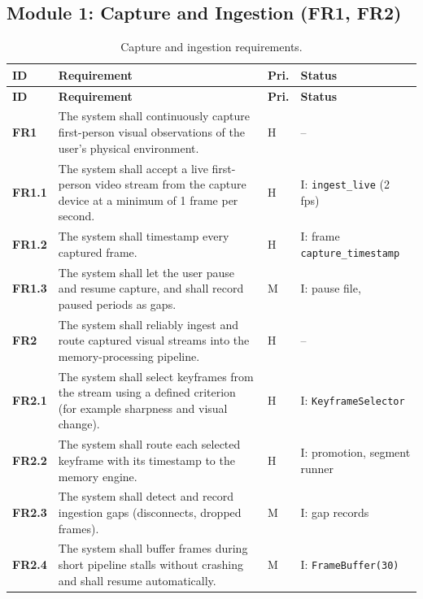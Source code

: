 \subsection{Module 1: Capture and Ingestion (FR1, FR2)}
\begin{ltab}
\begin{longtable}{@{}>{\bfseries}L{1.2cm}L{9.6cm}L{0.8cm}L{3.0cm}@{}}
\caption{Capture and ingestion requirements.}\\
\toprule
{}\textbf{ID} & \textbf{Requirement} & \textbf{Pri.} & \textbf{Status}\\
\midrule
\endfirsthead
\toprule
{}\textbf{ID} & \textbf{Requirement} & \textbf{Pri.} & \textbf{Status}\\
\midrule
\endhead
\bottomrule
\endfoot
{}FR1 & The system shall continuously capture first-person visual
observations of the user's physical environment. & H & --\\
FR1.1 & The system shall accept a live first-person video stream from the capture
device at a minimum of 1 frame per second. & H & I: \texttt{ingest\_live} (2 fps)\\
FR1.2 & The system shall timestamp every captured frame. & H & I: frame \texttt{capture\_timestamp}\\
FR1.3 & The system shall let the user pause and resume capture, and shall record
paused periods as gaps. & M & I: pause file, \\
FR2 & The system shall reliably ingest and route captured
visual streams into the memory-processing pipeline. & H & --\\
FR2.1 & The system shall select keyframes from the stream using a defined
criterion (for example sharpness and visual change). & H & I: \texttt{KeyframeSelector}\\
FR2.2 & The system shall route each selected keyframe with its timestamp to the
memory engine. & H & I: promotion, segment runner\\
FR2.3 & The system shall detect and record ingestion gaps (disconnects, dropped
frames). & M & I: gap records\\
FR2.4 & The system shall buffer frames during short pipeline stalls without
crashing and shall resume automatically. & M & I: \texttt{FrameBuffer(30)}\\
\end{longtable}
\end{ltab}

